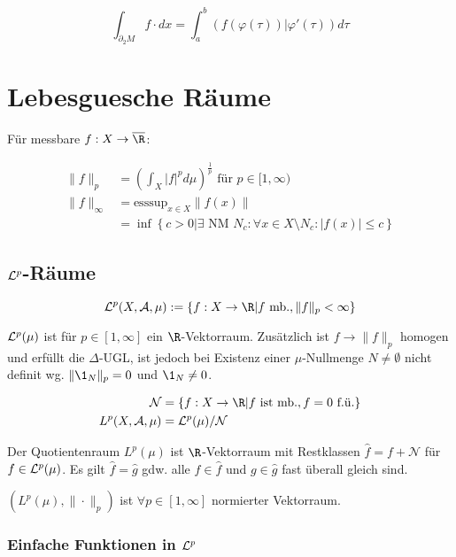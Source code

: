 $$\int_{\partial_2 M} f \cdot dx = \int_a^b (f(\varphi(\tau))|\varphi'(\tau)) d\tau$$

\section*{Lebesguesche Räume}

Für messbare $f : X \to \overline\R$:

\vspace{-4mm}
\begin{align*}
\|f\|_p &= \left(\int_X |f|^p d\mu\right)^\frac{1}{p} \text{ für } p \in [1,\infty)\\
\|f\|_\infty &= \text{esssup}_{x \in X} \|f(x)\|\\
      &= \inf\left\{ c > 0 | \exists \text{ NM } N_c : \forall x \in X \setminus N_c : |f(x)| \leq c\right\}
\end{align*}

\subsection*{$\mathcal{L}^p$-Räume}

$$\L^p(X,\A,\mu) := \{ f : X \to \R | f \text{ mb.}, \|f\|_p < \infty\}$$

$\mathcal{L}^p(\mu)$ ist für $p \in [1,\infty]$ ein $\R$-Vektorraum. Zusätzlich ist $f \to \|f\|_p$ homogen und erfüllt die $\Delta$-UGL, ist jedoch bei Existenz einer $\mu$-Nullmenge $N \neq \emptyset$ nicht definit wg. $\|\1_N\|_p = 0$ und $\1_N \neq 0$.

\vspace{-4mm}
\begin{align*}
\mathcal{N} &= \{ f : X \to \R | f \text{ ist mb.}, f = 0 \text{ f.ü.}\} \\
L^p(X,\A,\mu) &= \L^p(\mu) / \mathcal{N}
\end{align*}

Der Quotientenraum $L^p(\mu)$ ist $\R$-Vektorraum mit Restklassen $\hat f = f + \mathcal{N}$ für $f \in \mathcal{L}^p(\mu)$. Es gilt $\hat f = \hat g$ gdw. alle $f \in \hat f$ und $g \in \hat g$ fast überall gleich sind.

\spacing

$(L^p(\mu),\|\cdot\|_p)$ ist $\forall p \in [1,\infty]$ normierter Vektorraum.

\subsubsection*{Einfache Funktionen in $\mathcal{L}^p$}

